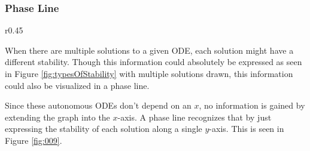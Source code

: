 \documentclass[12pt]{article}
\begin{document}
\newpage
\subsubsection{Phase Line}
\label{sssec:phaseLine}

\begin{wrapfigure}[]{r}{0.45\textwidth}
  \vspace{-20pt}
  \centering
  
  \caption{Phase Line}
  \label{fig:009}
\end{wrapfigure}

When there are multiple solutions to a given ODE, each solution might have a different stability. Though this information could absolutely be expressed as seen in Figure \ref{fig:typesOfStability} with multiple {\color{gr} solutions} drawn, this information could also be visualized in a phase line.

Since these autonomous ODEs don't depend on an $x$, no information is gained by extending the graph into the $x$-axis. A phase line recognizes that by just expressing the stability of each solution along a single $y$-axis. This is seen in Figure \ref{fig:009}.
\end{document}
